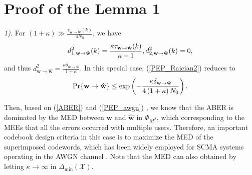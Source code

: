 \documentclass[journal]{IEEEtran}
\begin{document}
 \appendices
\section{Proof of the Lemma 1} 
\label{AppeA}
\textit{1). }   For  $(1+\kappa) \gg \frac{ \tau _{{{\mathbf w}} \rightarrow {\tilde{\mathbf{w}}}}(k)  }{4N_0}$, we have 
  \begin{equation}
   \small
  \label{d_awgn}
d_{1, \mathbf{w} \to \mathbf{\hat{w}} }^2(k) = \frac{\kappa \tau _{{{\mathbf w}} \rightarrow {\tilde{\mathbf{w}}}}(k) }{\kappa +1}, d_{2, \mathbf{w} \to \mathbf{\hat{w}} }^2(k)=0,
    \end{equation}
and thus $d_{ \mathbf{w} \to \mathbf{\hat{w}} }^2 = \frac{\kappa \delta_{{{\mathbf w}} \rightarrow {\tilde{\mathbf{w}}}}}{1+\kappa}$. In this special case, (\ref{PEP_Raician2})   reduces to 
\begin{equation}
 \small
 \label{PEP_awgn}
\begin{aligned} 
\text{Pr} \{\mathbf{w} \to \mathbf{\hat{w}}\}   \leq  \exp \left(-\frac{\kappa \delta_{{{\mathbf w}} \rightarrow {\tilde{\mathbf{w}}}}}{4\left( 1+\kappa \right)N_0}\right).
\end{aligned}
  \end{equation}
  
Then, based on  (\ref{ABER}) and  (\ref{PEP_awgn}) , we know that the ABER is dominated by the  MED  between $ \mathbf {w} $ and $\hat {\mathbf {w}}$ in $\Phi _{M^J}$, which corresponding to the MEEs that  all the errors occurred with multiple users.  Therefore,   an important codebook design criteria in this case   is  to  maximize  the MED of the superimposed codewords, which has been widely employed  for SCMA systems operating in the   AWGN channel \cite{klimentyev2017scma,huang2021downlink,li2020design}.  Note that the MED can also obtained by letting   $\kappa \rightarrow \infty$ in $ {{\Delta}_{\min} \left( { \boldsymbol {\mathcal X}} \right)}$. 
      
      
      
\end{document}
